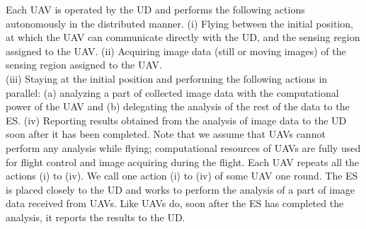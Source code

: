 \documentclass{ieeeaccess}
\begin{document}
Each UAV is operated by the UD and performs the following actions autonomously in the distributed manner.
%
(i) Flying between the initial position, at which the UAV can communicate directly with the UD, and the sensing region assigned to the UAV.
(i\hspace{-.1em}i) Acquiring image data (still or moving images) of the sensing region assigned to the UAV.\\
(i\hspace{-.1em}i\hspace{-.1em}i) Staying at the initial position and performing the following actions in parallel: (a) analyzing a part of collected image data with the computational power of the UAV and (b) delegating the analysis of the rest of the data to the ES.
(i\hspace{-.1em}v) Reporting results obtained from the analysis of image data to the UD soon after it has been completed.
%
Note that we assume that UAVs cannot perform any analysis while flying; computational resources of UAVs are fully used for flight control and image acquiring during the flight. Each UAV repeats all the actions (i) to (i\hspace{-.1em}v). We call one action (i) to (i\hspace{-.1em}v) of some UAV one round.
%
The ES is placed closely to the UD and works to perform the analysis of a part of image data received from UAVs.
%
Like UAVs do, soon after the ES has completed the analysis, it reports the results to the UD.
\end{document}
